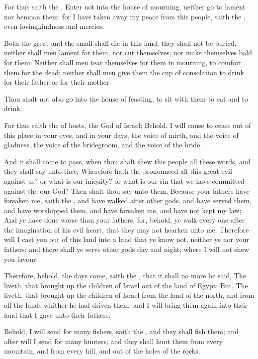 \verse For thus saith the \LORD, Enter not into the house of mourning, neither go to lament nor bemoan them: for I have taken away my peace from this people, saith the \LORD, even lovingkindness and mercies.

\verse Both the great and the small shall die in this land: they shall not be buried, neither shall men lament for them, nor cut themselves, nor make themselves bald for them: \verse Neither shall men tear themselves for them in mourning, to comfort them for the dead; neither shall men give them the cup of consolation to drink for their father or for their mother.

\verse Thou shalt not also go into the house of feasting, to sit with them to eat and to drink.

\verse For thus saith the \LORD of hosts, the God of Israel; Behold, I will cause to cease out of this place in your eyes, and in your days, the voice of mirth, and the voice of gladness, the voice of the bridegroom, and the voice of the bride.

\verse And it shall come to pass, when thou shalt shew this people all these words, and they shall say unto thee, Wherefore hath the \LORD pronounced all this great evil against us? or what is our iniquity? or what is our sin that we have committed against the \LORD our God?  \verse Then shalt thou say unto them, Because your fathers have forsaken me, saith the \LORD, and have walked after other gods, and have served them, and have worshipped them, and have forsaken me, and have not kept my law; \verse And ye have done worse than your fathers; for, behold, ye walk every one after the imagination of his evil heart, that they may not hearken unto me: \verse Therefore will I cast you out of this land into a land that ye know not, neither ye nor your fathers; and there shall ye serve other gods day and night; where I will not shew you favour.

\verse Therefore, behold, the days come, saith the \LORD, that it shall no more be said, The \LORD liveth, that brought up the children of Israel out of the land of Egypt; \verse But, The \LORD liveth, that brought up the children of Israel from the land of the north, and from all the lands whither he had driven them: and I will bring them again into their land that I gave unto their fathers.

\verse Behold, I will send for many fishers, saith the \LORD, and they shall fish them; and after will I send for many hunters, and they shall hunt them from every mountain, and from every hill, and out of the holes of the rocks.


